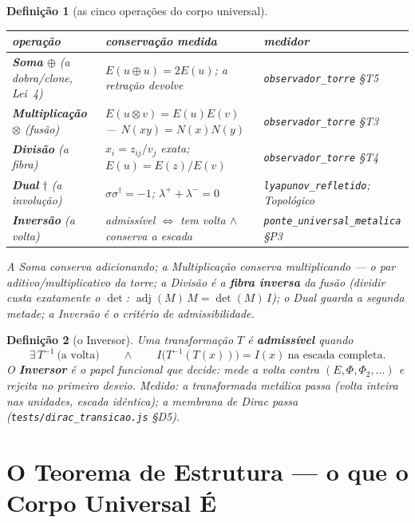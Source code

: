 \documentclass[11pt,a4paper]{article}
\newtheorem{definicao}{Definição}
\newcommand{\code}[1]{\texttt{\small #1}}
\begin{document}
\begin{definicao}[as cinco operações do corpo universal]\label{def:cinco}
\begin{center}\small
\begin{tabular}{@{}lll@{}}
\toprule
operação & conservação medida & medidor \\
\midrule
\textbf{Soma} $\oplus$ (a dobra/clone, Lei~4) & $E(u\oplus u)=2E(u)$; a retração devolve & \code{observador\_torre} \S T5 \\
\textbf{Multiplicação} $\otimes$ (fusão) & $E(u\otimes v)=E(u)E(v)$ --- $N(xy)=N(x)N(y)$ & \code{observador\_torre} \S T3 \\
\textbf{Divisão} (a fibra) & $x_i=z_{ij}/v_j$ exata; $E(u)=E(z)/E(v)$ & \code{observador\_torre} \S T4 \\
\textbf{Dual} $\dagger$ (a involução) & $\sigma\sigma^{\dagger}=-1$; $\lambda^{+}+\lambda^{-}=0$ & \code{lyapunov\_refletido}; \emph{Topológico} \\
\textbf{Inversão} (a volta) & admissível $\iff$ tem volta $\wedge$ conserva a escada & \code{ponte\_universal\_metalica} \S P3 \\
\bottomrule
\end{tabular}
\end{center}
A Soma conserva \emph{adicionando}; a Multiplicação conserva
\emph{multiplicando} --- o par aditivo/multiplicativo da torre; a
Divisão é a \textbf{fibra inversa} da fusão (dividir custa exatamente o
$\det$: $\operatorname{adj}(M)\,M=\det(M)\,I$); o Dual guarda a segunda
metade; a Inversão é o critério de admissibilidade.
\end{definicao}

\begin{definicao}[o Inversor]\label{def:inversor}
Uma transformação $T$ é \textbf{admissível} quando
\[
\boxed{
\exists\,T^{-1}\ \text{(a volta)}
\qquad\land\qquad
I\bigl(T^{-1}(T(x))\bigr)=I(x)\ \text{na escada completa}.
}
\]
O \textbf{Inversor} é o papel funcional que decide: mede a volta contra
$(E,\Phi,\Phi_2,\ldots)$ e rejeita no primeiro desvio. Medido: a
transformada metálica passa (volta inteira nas unidades, escada
idêntica); a membrana de Dirac passa
(\code{tests/dirac\_transicao.js} \S D5).
\end{definicao}

\section{O Teorema de Estrutura --- o que o Corpo Universal É}
\label{sec:estrutura}
\end{document}
